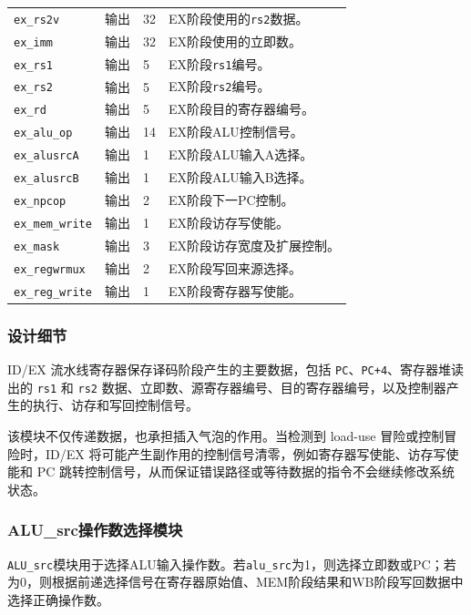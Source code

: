 \documentclass[UTF8,a4paper,12pt]{ctexart}
\newcommand{\code}[1]{\texttt{#1}}
\begin{document}
{\begin{longtable}{p{3.2cm}p{1.5cm}p{2.1cm}p{7.0cm}}
\code{ex\_rs2v} & 输出 & 32 & EX阶段使用的\code{rs2}数据。 \\
\code{ex\_imm} & 输出 & 32 & EX阶段使用的立即数。 \\
\code{ex\_rs1} & 输出 & 5 & EX阶段\code{rs1}编号。 \\
\code{ex\_rs2} & 输出 & 5 & EX阶段\code{rs2}编号。 \\
\code{ex\_rd} & 输出 & 5 & EX阶段目的寄存器编号。 \\
\code{ex\_alu\_op} & 输出 & 14 & EX阶段ALU控制信号。 \\
\code{ex\_alusrcA} & 输出 & 1 & EX阶段ALU输入A选择。 \\
\code{ex\_alusrcB} & 输出 & 1 & EX阶段ALU输入B选择。 \\
\code{ex\_npcop} & 输出 & 2 & EX阶段下一PC控制。 \\
\code{ex\_mem\_write} & 输出 & 1 & EX阶段访存写使能。 \\
\code{ex\_mask} & 输出 & 3 & EX阶段访存宽度及扩展控制。 \\
\code{ex\_regwrmux} & 输出 & 2 & EX阶段写回来源选择。 \\
\code{ex\_reg\_write} & 输出 & 1 & EX阶段寄存器写使能。 \\
\bottomrule
\end{longtable}
}

\subsubsection*{设计细节}

ID/EX 流水线寄存器保存译码阶段产生的主要数据，包括 \code{PC}、\code{PC+4}、寄存器堆读出的 \code{rs1} 和 \code{rs2} 数据、立即数、源寄存器编号、目的寄存器编号，以及控制器产生的执行、访存和写回控制信号。

该模块不仅传递数据，也承担插入气泡的作用。当检测到 load-use 冒险或控制冒险时，ID/EX 将可能产生副作用的控制信号清零，例如寄存器写使能、访存写使能和 PC 跳转控制信号，从而保证错误路径或等待数据的指令不会继续修改系统状态。

\subsubsection{ALU\_src操作数选择模块}

\code{ALU\_src}模块用于选择ALU输入操作数。若\code{alu\_src}为1，则选择立即数或PC；若为0，则根据前递选择信号在寄存器原始值、MEM阶段结果和WB阶段写回数据中选择正确操作数。
\end{document}
